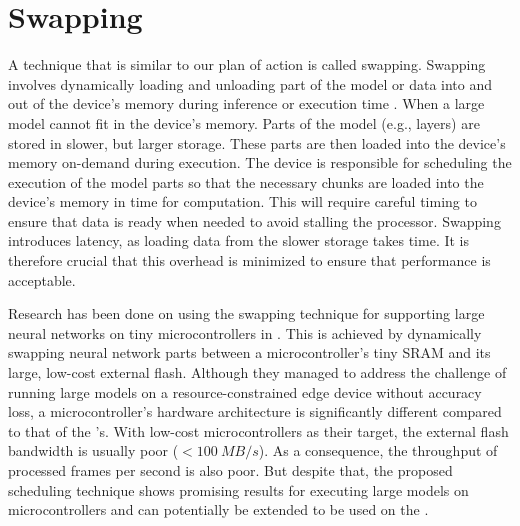\section{Swapping}

A technique that is similar to our plan of action is called swapping.
Swapping involves dynamically loading and unloading part of the model or data into and out of the device’s memory during inference or execution time \cite{wangSwapNetEfficientSwapping2024, huangSwapAdvisorPushingDeep2020}.
\cite{wang_swapnet_2024, huang_swapadvisor_2020}
When a large model cannot fit in the device’s memory. Parts of the model (e.g., layers) are stored in slower, but larger storage.
These parts are then loaded into the device’s memory on-demand during execution.
The device is responsible for scheduling the execution of the model parts so that the necessary chunks are loaded into the device’s memory in time for computation.
This will require careful timing to ensure that data is ready when needed to avoid stalling the processor.
Swapping introduces latency, as loading data from the slower storage takes time.
It is therefore crucial that this overhead is minimized to ensure that performance is acceptable.

Research has been done on using the swapping technique for supporting large neural networks on tiny microcontrollers in \cite{miaoEnablingLargeNeural2021}.
This is achieved by dynamically swapping neural network parts between a microcontroller's tiny SRAM and its large, low-cost external flash.
Although they managed to address the challenge of running large models on a resource-constrained edge device without accuracy loss, a microcontroller's hardware architecture is significantly different compared to that of the \graicore{}'s.
With low-cost microcontrollers as their target, the external flash bandwidth is usually poor ($<\SI{100}{MB/s}$).
As a consequence, the throughput of processed frames per second is also poor.
But despite that, the proposed scheduling technique shows promising results for executing large models on microcontrollers and can potentially be extended to be used on the \graicore{}.